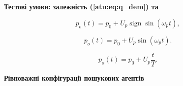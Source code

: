 \documentclass[14pt,handout,utf8]{beamer}
\DeclareMathOperator*{\sign}{sign}
\newcommand{\Xhead}[1]{
 \begin{center}%
      \textbf{#1}%
 \end{center}%
}
\begin{document}
\begin{frame}
  \frametitle{~}

  \Xhead{Тестові умови: залежність  (\ref{atu:eq:q_dem}) та}

  \begin{equation}
    p_o(t) = p_0 +  U_{p} \sign \sin( \omega_{p} t ),
    \label{atu:eq:po_t_sign}
  \end{equation}

  \begin{equation}
    p_o(t) = p_0 +  U_{p} \sin( \omega_{p} t ).
    \label{atu:eq:po_t_sin}
  \end{equation}

  \begin{equation}
    p_o(t) = p_0 +  U_{p} \frac{t}{T}.
    \label{atu:eq:po_t_ramp}
  \end{equation}

  \Xhead{Рівноважні конфігурації пошукових агентів}


\end{frame}
\end{document}
